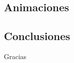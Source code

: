 \documentclass[hyperref={pdfpagelayout=SinglePage}]{beamer}
\begin{document}
\subsection{Animaciones}

%
%

\subsection{Conclusiones}


\begin{frame}[plain,c]
\begin{center}
	\Huge Gracias
\end{center}
\end{frame}
\end{document}
